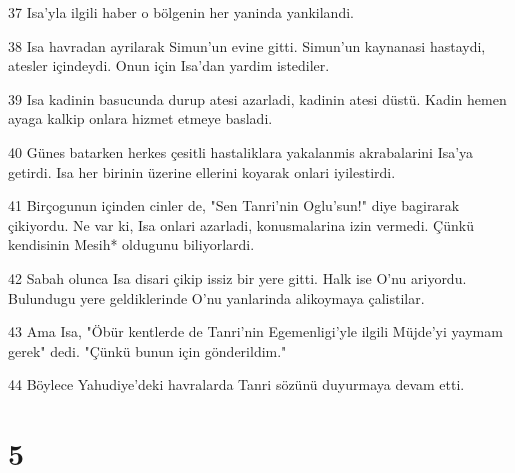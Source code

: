 \par 37 Isa'yla ilgili haber o bölgenin her yaninda yankilandi.
\par 38 Isa havradan ayrilarak Simun'un evine gitti. Simun'un kaynanasi hastaydi, atesler içindeydi. Onun için Isa'dan yardim istediler.
\par 39 Isa kadinin basucunda durup atesi azarladi, kadinin atesi düstü. Kadin hemen ayaga kalkip onlara hizmet etmeye basladi.
\par 40 Günes batarken herkes çesitli hastaliklara yakalanmis akrabalarini Isa'ya getirdi. Isa her birinin üzerine ellerini koyarak onlari iyilestirdi.
\par 41 Birçogunun içinden cinler de, "Sen Tanri'nin Oglu'sun!" diye bagirarak çikiyordu. Ne var ki, Isa onlari azarladi, konusmalarina izin vermedi. Çünkü kendisinin Mesih* oldugunu biliyorlardi.
\par 42 Sabah olunca Isa disari çikip issiz bir yere gitti. Halk ise O'nu ariyordu. Bulundugu yere geldiklerinde O'nu yanlarinda alikoymaya çalistilar.
\par 43 Ama Isa, "Öbür kentlerde de Tanri'nin Egemenligi'yle ilgili Müjde'yi yaymam gerek" dedi. "Çünkü bunun için gönderildim."
\par 44 Böylece Yahudiye'deki havralarda Tanri sözünü duyurmaya devam etti.

\chapter{5}

